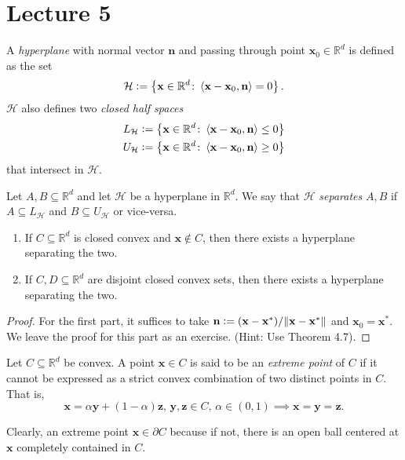 \section{Lecture 5}

\begin{defn}
    A \emph{hyperplane} with normal vector $\mathbf{n}$ and passing through point $\mathbf{x}_0 \in \mathbb{R}^d$ is defined as the set
    \[
        \mathcal{H} \vcentcolon= \left\{ \mathbf{x} \in \mathbb{R}^d \colon \left\langle \mathbf{x} - \mathbf{x}_0, \mathbf{n} \right\rangle = 0 \right\}.
    \]
    $\mathcal{H}$ also defines two \emph{closed half spaces}
    \begin{align*}
        L_{\mathcal{H}} &\vcentcolon= \left\{ \mathbf{x} \in \mathbb{R}^d \colon \left\langle \mathbf{x} - \mathbf{x}_0, \mathbf{n} \right\rangle \leq 0 \right\} \\
        U_{\mathcal{H}} &\vcentcolon= \left\{ \mathbf{x} \in \mathbb{R}^d \colon \left\langle \mathbf{x} - \mathbf{x}_0, \mathbf{n} \right\rangle \geq 0 \right\}
    \end{align*}
    that intersect in $\mathcal{H}$.
\end{defn}

\begin{defn}
    Let $A,B \subseteq \mathbb{R}^d$ and let $\mathcal{H}$ be a hyperplane in $\mathbb{R}^d$. We say that $\mathcal{H}$ \emph{separates} $A,B$ if $A \subseteq L_{\mathcal{H}}$ and $B \subseteq U_{\mathcal{H}}$ or vice-versa. 
\end{defn}

\begin{thm}
    \begin{enumerate}
        \item If $C \subseteq \mathbb{R}^d$ is closed convex and $\mathbf{x} \notin C$, then there exists a hyperplane separating the two. 
        \item If $C,D \subseteq \mathbb{R}^d$ are disjoint closed convex sets, then there exists a hyperplane separating the two. 
    \end{enumerate}
\end{thm}
\begin{proof}
    For the first part, it suffices to take $\mathbf{n} \vcentcolon= (\mathbf{x} - \mathbf{x}^*)/\norm{\mathbf{x} - \mathbf{x}^*}$ and $\mathbf{x}_0 = \mathbf{x}^*$. We leave the proof for this part as an exercise. (Hint: Use Theorem 4.7).
\end{proof}

\begin{defn}
    Let $C \subseteq \mathbb{R}^d$ be convex. A point $\mathbf{x} \in C$ is said to be an \emph{extreme point} of $C$ if it cannot be expressed as a strict convex combination of two distinct points in $C$. That is,
    \[
        \mathbf{x} = \alpha \mathbf{y} + (1-\alpha) \mathbf{z}, \, \mathbf{y}, \mathbf{z} \in C, \, \alpha \in (0,1) \implies \mathbf{x} = \mathbf{y} = \mathbf{z}.
    \]
\end{defn}
Clearly, an extreme point $\mathbf{x} \in \partial C$ because if not, there is an open ball centered at $\mathbf{x}$ completely contained in $C$. 


